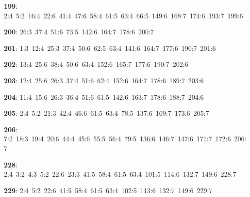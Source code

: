\noindent \textbf{199}: 2:4\allowbreak\ 5:2\allowbreak\ 16:4\allowbreak\ 22:6\allowbreak\ 41:4\allowbreak\ 47:6\allowbreak\ 58:4\allowbreak\ 61:5\allowbreak\ 63:4\allowbreak\ 66:5\allowbreak\ 149:6\allowbreak\ 168:7\allowbreak\ 174:6\allowbreak\ 193:7\allowbreak\ 199:6\par
\noindent \textbf{200}: 26:3\allowbreak\ 37:4\allowbreak\ 51:6\allowbreak\ 73:5\allowbreak\ 142:6\allowbreak\ 164:7\allowbreak\ 178:6\allowbreak\ 200:7\par
\noindent \textbf{201}: 1:3\allowbreak\ 12:4\allowbreak\ 25:3\allowbreak\ 37:4\allowbreak\ 50:6\allowbreak\ 62:5\allowbreak\ 63:4\allowbreak\ 141:6\allowbreak\ 164:7\allowbreak\ 177:6\allowbreak\ 190:7\allowbreak\ 201:6\par
\noindent \textbf{202}: 13:4\allowbreak\ 25:6\allowbreak\ 38:4\allowbreak\ 50:6\allowbreak\ 63:4\allowbreak\ 152:6\allowbreak\ 165:7\allowbreak\ 177:6\allowbreak\ 190:7\allowbreak\ 202:6\par
\noindent \textbf{203}: 12:4\allowbreak\ 25:6\allowbreak\ 26:3\allowbreak\ 37:4\allowbreak\ 51:6\allowbreak\ 62:4\allowbreak\ 152:6\allowbreak\ 164:7\allowbreak\ 178:6\allowbreak\ 189:7\allowbreak\ 203:6\par
\noindent \textbf{204}: 11:4\allowbreak\ 15:6\allowbreak\ 26:3\allowbreak\ 36:4\allowbreak\ 51:6\allowbreak\ 61:5\allowbreak\ 142:6\allowbreak\ 163:7\allowbreak\ 178:6\allowbreak\ 188:7\allowbreak\ 204:6\par
\noindent \textbf{205}: 2:4\allowbreak\ 5:2\allowbreak\ 21:3\allowbreak\ 42:4\allowbreak\ 46:6\allowbreak\ 61:5\allowbreak\ 63:4\allowbreak\ 78:5\allowbreak\ 137:6\allowbreak\ 169:7\allowbreak\ 173:6\allowbreak\ 205:7\par
\noindent \textbf{206}: 7:2\allowbreak\ 18:3\allowbreak\ 19:4\allowbreak\ 20:6\allowbreak\ 44:4\allowbreak\ 45:6\allowbreak\ 55:5\allowbreak\ 56:4\allowbreak\ 79:5\allowbreak\ 136:6\allowbreak\ 146:7\allowbreak\ 147:6\allowbreak\ 171:7\allowbreak\ 172:6\allowbreak\ 206:7\par
\noindent \textbf{228}: 2:4\allowbreak\ 3:2\allowbreak\ 4:3\allowbreak\ 5:2\allowbreak\ 22:6\allowbreak\ 23:3\allowbreak\ 41:5\allowbreak\ 58:4\allowbreak\ 61:5\allowbreak\ 63:4\allowbreak\ 101:5\allowbreak\ 114:6\allowbreak\ 132:7\allowbreak\ 149:6\allowbreak\ 228:7\par
\noindent \textbf{229}: 2:4\allowbreak\ 5:2\allowbreak\ 22:6\allowbreak\ 41:5\allowbreak\ 58:4\allowbreak\ 61:5\allowbreak\ 63:4\allowbreak\ 102:5\allowbreak\ 113:6\allowbreak\ 132:7\allowbreak\ 149:6\allowbreak\ 229:7\par
